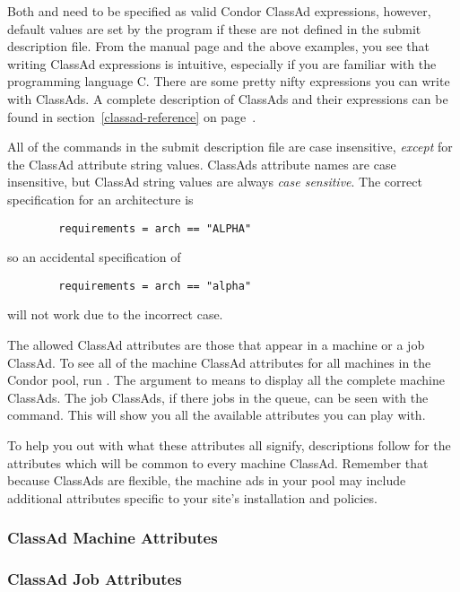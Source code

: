 Both  and  need to be specified 
as valid Condor ClassAd expressions, however, default values are set by the
 program if these are not defined in the submit description file.
From the  manual page and the above examples, you see
that writing ClassAd expressions is intuitive, especially if you
are familiar with the programming language C.  There are some
pretty nifty expressions you can write with ClassAds.
A complete description of ClassAds and their expressions
can be found in section~\ref{classad-reference} on 
page~\pageref{classad-reference}.

All of the commands in the submit description file are case insensitive, 
\emph{except} for the ClassAd attribute string values.
ClassAds attribute names are
case insensitive, but ClassAd string
values are always \emph{case sensitive}.
The correct specification for an architecture is
\begin{verbatim}
        requirements = arch == "ALPHA"
\end{verbatim}
so an accidental specification of
\begin{verbatim}
        requirements = arch == "alpha"
\end{verbatim}
will not work due to the incorrect case.

The allowed
ClassAd attributes are those 
that appear in a machine or a job ClassAd.
To see all of the machine ClassAd attributes for all machines in
the Condor pool, run .  
The  argument to
 means to display all the complete machine ClassAds.
The job ClassAds, if there jobs in the queue, can be seen
with the  command.
This
will show you all the available attributes you can play with.

To help you out with what these attributes all signify,
descriptions follow for the attributes which will be common to every
machine ClassAd. Remember that because ClassAds are flexible, the
machine ads in your pool may include additional attributes specific
to your site's installation and policies. 

\subsubsection{\label{user-man-machad}ClassAd Machine Attributes}


\subsubsection{\label{user-man-machad}ClassAd Job Attributes}


